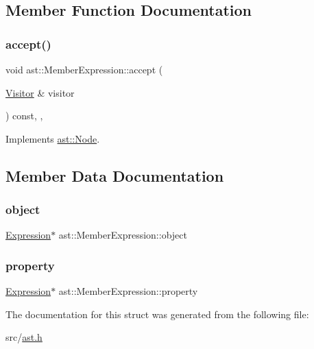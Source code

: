 \subsection{Member Function Documentation}
\mbox{\label{structast_1_1_member_expression_ad56039943b60ae28f37144bf3a343ba6}} 
\subsubsection{\texorpdfstring{accept()}{accept()}}
{\footnotesize\ttfamily void ast\+::\+Member\+Expression\+::accept (\begin{DoxyParamCaption}\item[{\hyperlink{structast_1_1_visitor}{Visitor} \&}]{visitor }\end{DoxyParamCaption}) const\hspace{0.3cm}{\ttfamily [inline]}, {\ttfamily [override]}, {\ttfamily [virtual]}}



Implements \hyperlink{structast_1_1_node_abc089ee6caaf06a4445ebdd8391fdebc}{ast\+::\+Node}.



\subsection{Member Data Documentation}
\mbox{\label{structast_1_1_member_expression_a458905d63f3ce6b483e6d628dad4536a}} 
\subsubsection{\texorpdfstring{object}{object}}
{\footnotesize\ttfamily \hyperlink{structast_1_1_expression}{Expression}$\ast$ ast\+::\+Member\+Expression\+::object}

\mbox{\label{structast_1_1_member_expression_a93f4f0b8c72eb8be2a8feb11bb67361c}} 
\subsubsection{\texorpdfstring{property}{property}}
{\footnotesize\ttfamily \hyperlink{structast_1_1_expression}{Expression}$\ast$ ast\+::\+Member\+Expression\+::property}



The documentation for this struct was generated from the following file\+:\begin{DoxyCompactItemize}
\item 
src/\hyperlink{ast_8h}{ast.\+h}\end{DoxyCompactItemize}
